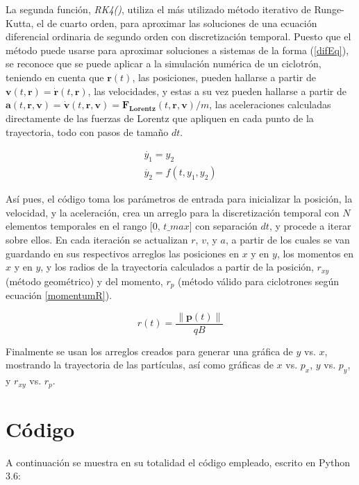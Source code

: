 \documentclass[letterpaper, 11pt]{article}
\begin{document}
\begin{multicols}{2}
La segunda función, \textit{RK4()}, utiliza el más utilizado método iterativo de Runge-Kutta, el de cuarto orden, para aproximar las soluciones de una ecuación diferencial ordinaria de segundo orden con discretización temporal. Puesto que el método puede usarse para aproximar soluciones a sistemas de la forma (\ref{difEq}), se reconoce que se puede aplicar a la simulación numérica de un ciclotrón, teniendo en cuenta que \(\textbf{r}(t)\), las posiciones, pueden hallarse a partir de \(\textbf{v}(t, \textbf{r}) = \mathbf{\dot{r}}(t, \textbf{r})\), las velocidades, y estas a su vez pueden hallarse a partir de \(\textbf{a}(t, \textbf{r}, \textbf{v}) = \mathbf{\dot{v}}(t, \textbf{r}, \textbf{v})= \mathbf{F_{Lorentz}}(t, \textbf{r}, \textbf{v})/m\), las aceleraciones calculadas directamente de las fuerzas de Lorentz que apliquen en cada punto de la trayectoria, todo con pasos de tamaño $dt$.

\begin{equation}
\label{difEq}
    \begin{gathered}
        \dot{y_1} = y_2\\
        \dot{y_2} = f(t, y_1, y_2)
    \end{gathered}
\end{equation}

Así pues, el código toma los parámetros de entrada para inicializar la posición, la velocidad, y la aceleración, crea un arreglo para la discretización temporal con $N$ elementos temporales en el rango [0, $t\_max$] con separación $dt$, y procede a iterar sobre ellos. En cada iteración se actualizan $r$, $v$, y $a$, a partir de los cuales se van guardando en sus respectivos arreglos las posiciones en $x$ y en $y$, los momentos en $x$ y en $y$, y los radios de la trayectoria calculados a partir de la posición, $r_{xy}$ (método geométrico) y del momento, $r_p$ (método válido para ciclotrones según ecuación \ref{momentumR}).

\begin{equation}
\label{momentumR}
    r(t) = \frac{\lVert \textbf{p} (t) \rVert}{q B}
\end{equation}

Finalmente se usan los arreglos creados para generar una gráfica de $y$ vs. $x$, mostrando la trayectoria de las partículas, así como gráficas de $x$ vs. $p_x$, $y$ vs. $p_y$, y $r_{xy}$ vs. $r_p$.

\end{multicols}

\section{Código}
A continuación se muestra en su totalidad el código empleado, escrito en Python 3.6:\\
\end{document}
